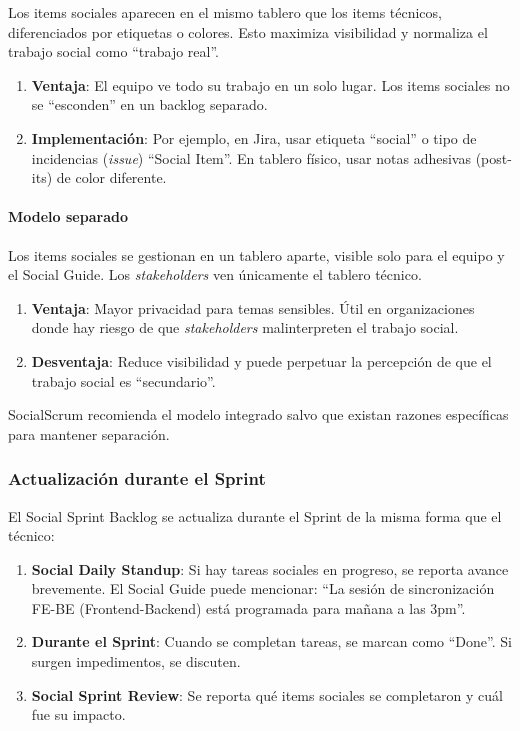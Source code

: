 Los items sociales aparecen en el mismo tablero que los items técnicos, diferenciados por etiquetas o colores. Esto maximiza visibilidad y normaliza el trabajo social como ``trabajo real''.

\begin{enumerate}
    \item \textbf{Ventaja}: El equipo ve todo su trabajo en un solo lugar. Los items sociales no se ``esconden'' en un backlog separado.
    \item \textbf{Implementación}: Por ejemplo, en Jira, usar etiqueta ``social'' o tipo de incidencias (\textit{issue}) ``Social Item''. En tablero físico, usar notas adhesivas (post-its) de color diferente.
\end{enumerate}

\paragraph{Modelo separado}

Los items sociales se gestionan en un tablero aparte, visible solo para el equipo y el Social Guide. Los \textit{stakeholders} ven únicamente el tablero técnico.

\begin{enumerate}
    \item \textbf{Ventaja}: Mayor privacidad para temas sensibles. Útil en organizaciones donde hay riesgo de que \textit{stakeholders} malinterpreten el trabajo social.
    \item \textbf{Desventaja}: Reduce visibilidad y puede perpetuar la percepción de que el trabajo social es ``secundario''.
\end{enumerate}

SocialScrum recomienda el modelo integrado salvo que existan razones específicas para mantener separación.

\subsubsection{Actualización durante el Sprint}

El Social Sprint Backlog se actualiza durante el Sprint de la misma forma que el técnico:

\begin{enumerate}
    \item \textbf{Social Daily Standup}: Si hay tareas sociales en progreso, se reporta avance brevemente. El Social Guide puede mencionar: ``La sesión de sincronización FE-BE (Frontend-Backend) está programada para mañana a las 3pm''.

    \item \textbf{Durante el Sprint}: Cuando se completan tareas, se marcan como ``Done''. Si surgen impedimentos, se discuten.

    \item \textbf{Social Sprint Review}: Se reporta qué items sociales se completaron y cuál fue su impacto.
\end{enumerate}

